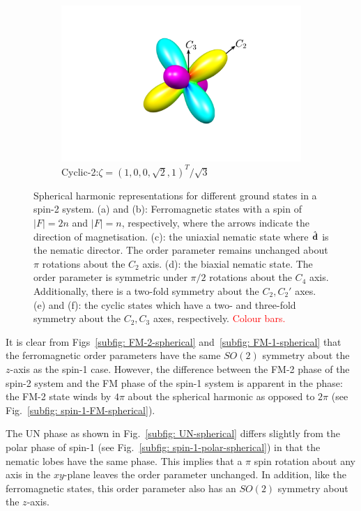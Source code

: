 \begin{figure}
\begin{subfigure}{0.49\textwidth}
        \includegraphics[width=\textwidth]
        {gfx/ch-groundStateSymmetries/C2-spherical.pdf}
        \caption{\label{subfig: C-2-spherical}
        Cyclic-2:\@ \(\zeta={(1, 0, 0, \sqrt{2}, 1)}^T/\sqrt{3}\)}
    \end{subfigure}
    \caption{\label{fig: spin-2-spherical-harmonics}Spherical harmonic
        representations for different ground states in a spin-2 system.
        (a) and (b): Ferromagnetic states with a spin of \(|F|=2n\) and \(|F|=n\),
        respectively, where the arrows indicate the direction of magnetisation.
        (c): the uniaxial nematic state where \(\hat{\vb{d}}\) is the nematic
        director. The order parameter remains unchanged about \(\pi \) rotations
        about the \(C_2\) axis.
        (d): the biaxial nematic state. The order parameter is symmetric under
        \(\pi/2\) rotations about the \(C_4\) axis.
        Additionally, there is a two-fold symmetry about the \(C_2, C_2'\) axes.
        (e) and (f): the cyclic states which have a two- and three-fold symmetry
        about the \(C_2, C_3\) axes, respectively.
        \textcolor{red}{Colour bars.}}
\end{figure}

It is clear from Figs~\ref{subfig: FM-2-spherical}
and~\ref{subfig: FM-1-spherical} that the ferromagnetic order parameters have
the same \(SO(2)\) symmetry about the \(z\)-axis as the spin-1 case.
However, the difference between the FM-2 phase of the spin-2 system and the FM
phase of the spin-1 system is apparent in the phase: the FM-2 state winds by
\(4\pi \) about the spherical harmonic as opposed to \(2\pi \)
(see Fig.~\ref{subfig: spin-1-FM-spherical}).

The UN phase as shown in Fig.~\ref{subfig: UN-spherical} differs slightly from
the polar phase of spin-1 (see Fig.~\ref{subfig: spin-1-polar-spherical}) in
that the nematic lobes have the same phase.
This implies that a \(\pi \) spin rotation about any axis in the \(xy\)-plane
leaves the order parameter unchanged.
In addition, like the ferromagnetic states, this order parameter also has an
\(SO(2)\) symmetry about the \(z\)-axis.

